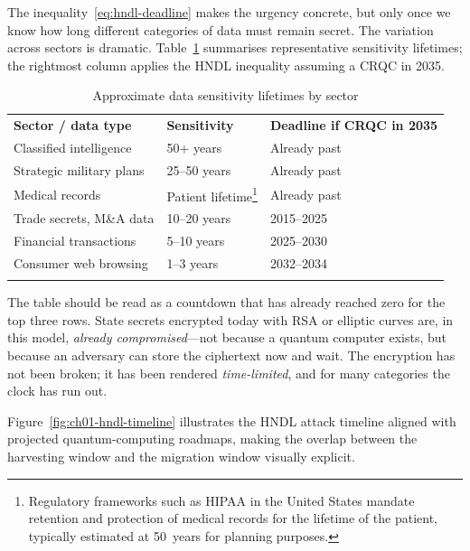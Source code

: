 The inequality~\eqref{eq:hndl-deadline} makes the urgency concrete, but only once we know how long different categories of data must remain secret.  The variation across sectors is dramatic.  Table~\ref{tab:hndl-sensitivity} summarises representative sensitivity lifetimes; the rightmost column applies the HNDL inequality assuming a CRQC in 2035.

\begin{table}[t]
\caption{Approximate data sensitivity lifetimes by sector}
\label{tab:hndl-sensitivity}
\begin{tabular}{p{4.5cm}p{3cm}p{3.5cm}}
\hline\noalign{\smallskip}
\textbf{Sector / data type} & \textbf{Sensitivity} & \textbf{Deadline if CRQC in 2035} \\
\noalign{\smallskip}\svhline\noalign{\smallskip}
Classified intelligence     & 50+ years  & Already past \\
Strategic military plans    & 25--50 years & Already past \\
Medical records             & Patient lifetime\footnote{Regulatory frameworks such as HIPAA in the United States mandate retention and protection of medical records for the lifetime of the patient, typically estimated at 50~years for planning purposes.} & Already past \\
Trade secrets, M\&A data    & 10--20 years & 2015--2025 \\
Financial transactions      & 5--10 years  & 2025--2030 \\
Consumer web browsing       & 1--3 years   & 2032--2034 \\
\noalign{\smallskip}\hline
\end{tabular}
\end{table}

The table should be read as a countdown that has already reached zero for the top three rows.  State secrets encrypted today with RSA or elliptic curves are, in this model, \emph{already compromised}---not because a quantum computer exists, but because an adversary can store the ciphertext now and wait.  The encryption has not been broken; it has been rendered \emph{time-limited}, and for many categories the clock has run out.

Figure~\ref{fig:ch01-hndl-timeline} illustrates the HNDL attack timeline aligned with projected quantum-computing roadmaps, making the overlap between the harvesting window and the migration window visually explicit.

